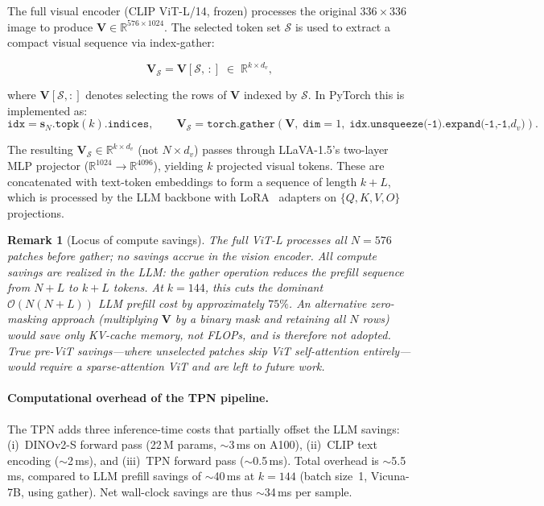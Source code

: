 \documentclass[11pt,a4paper]{article}
\newcommand{\R}{\mathbb{R}}
\newcommand{\vs}{\mathbf{s}}
\newcommand{\mV}{\mathbf{V}}
\newtheorem{remark}{Remark}
\begin{document}
The full visual encoder (CLIP ViT-L/14, frozen) processes the original
$336{\times}336$ image to produce $\mV \in \R^{576 \times 1024}$.
The selected token set $\mathcal{S}$ is used to extract a compact visual
sequence via index-gather:

\begin{equation}
  \mV_{\mathcal{S}} = \mV[\mathcal{S},\, :] \;\in\; \R^{k \times d_v},
  \label{eq:gather}
\end{equation}

where $\mV[\mathcal{S}, :]$ denotes selecting the rows of $\mV$ indexed by
$\mathcal{S}$.
In PyTorch this is implemented as:
\begin{equation}
  \texttt{idx} = \vs_N.\texttt{topk}(k).\texttt{indices},
  \qquad
  \mV_\mathcal{S} = \texttt{torch.gather}(\mV,\; \texttt{dim}{=}1,\;
    \texttt{idx.unsqueeze(-1).expand(-1,-1,}d_v\texttt{)}).
\end{equation}

The resulting $\mV_\mathcal{S} \in \R^{k \times d_v}$ (not $N \times d_v$)
passes through LLaVA-1.5's two-layer MLP projector
($\R^{1024} \to \R^{4096}$), yielding $k$ projected visual tokens.
These are concatenated with text-token embeddings to form a sequence of
length $k{+}L$, which is processed by the LLM backbone with
LoRA~\citep{hu2022lora} adapters on $\{Q,K,V,O\}$ projections.

\begin{remark}[Locus of compute savings]
  \label{rem:savings}
  The full ViT-L processes all $N{=}576$ patches before gather; no savings
  accrue in the vision encoder.
  All compute savings are realized in the LLM: the gather operation reduces
  the prefill sequence from $N{+}L$ to $k{+}L$ tokens.
  At $k{=}144$, this cuts the dominant $\mathcal{O}(N(N{+}L))$ LLM prefill
  cost by approximately $75\%$.
  An alternative zero-masking approach (multiplying $\mV$ by a binary mask
  and retaining all $N$ rows) would save only KV-cache memory, not FLOPs,
  and is therefore not adopted.
  True pre-ViT savings---where unselected patches skip ViT self-attention
  entirely---would require a sparse-attention ViT and are left to future work.
\end{remark}

\paragraph{Computational overhead of the TPN pipeline.}
The TPN adds three inference-time costs that partially offset the LLM savings:
(i)~DINOv2-S forward pass (22\,M params, $\sim$3\,ms on A100),
(ii)~CLIP text encoding ($\sim$2\,ms), and
(iii)~TPN forward pass ($\sim$0.5\,ms).
Total overhead is $\sim$5.5\,ms, compared to LLM prefill savings of
$\sim$40\,ms at $k{=}144$ (batch size~1, Vicuna-7B, using gather).
Net wall-clock savings are thus $\sim$34\,ms per sample.
\end{document}

